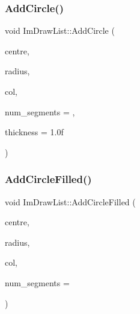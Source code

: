 \mbox{\label{struct_im_draw_list_a26c34a87eca6aefa02ca4e4951dcd170}} 
\subsubsection{\texorpdfstring{Add\+Circle()}{AddCircle()}}
{\footnotesize\ttfamily void Im\+Draw\+List\+::\+Add\+Circle (\begin{DoxyParamCaption}\item[{const \mbox{\hyperlink{struct_im_vec2}{Im\+Vec2}} \&}]{centre,  }\item[{float}]{radius,  }\item[{\mbox{\hyperlink{imgui_8h_a118cff4eeb8d00e7d07ce3d6460eed36}{Im\+U32}}}]{col,  }\item[{int}]{num\+\_\+segments = {},  }\item[{float}]{thickness = {\ttfamily 1.0f} }\end{DoxyParamCaption})}

\mbox{\label{struct_im_draw_list_a293e87d22e17587e3994cf6deb20be45}} 
\subsubsection{\texorpdfstring{Add\+Circle\+Filled()}{AddCircleFilled()}}
{\footnotesize\ttfamily void Im\+Draw\+List\+::\+Add\+Circle\+Filled (\begin{DoxyParamCaption}\item[{const \mbox{\hyperlink{struct_im_vec2}{Im\+Vec2}} \&}]{centre,  }\item[{float}]{radius,  }\item[{\mbox{\hyperlink{imgui_8h_a118cff4eeb8d00e7d07ce3d6460eed36}{Im\+U32}}}]{col,  }\item[{int}]{num\+\_\+segments = {} }\end{DoxyParamCaption})}

\mbox{\label{struct_im_draw_list_a9817e2a41cffdd2ff810a715bdb0eba9}} 
